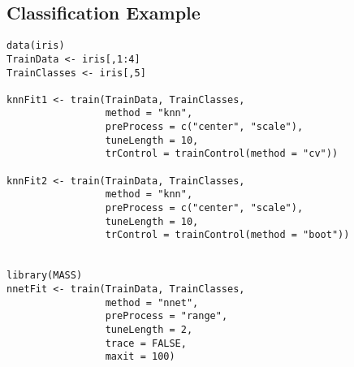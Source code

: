 \documentclass[caret-main.tex]{subfiles}
\begin{document}
\subsection{Classification Example}
\begin{framed} 
\begin{verbatim} 
data(iris)
TrainData <- iris[,1:4]
TrainClasses <- iris[,5]
 
knnFit1 <- train(TrainData, TrainClasses,
                 method = "knn",
                 preProcess = c("center", "scale"),
                 tuneLength = 10,
                 trControl = trainControl(method = "cv"))
 
knnFit2 <- train(TrainData, TrainClasses,
                 method = "knn",
                 preProcess = c("center", "scale"),
                 tuneLength = 10, 
                 trControl = trainControl(method = "boot"))
 
 
library(MASS)
nnetFit <- train(TrainData, TrainClasses,
                 method = "nnet",
                 preProcess = "range", 
                 tuneLength = 2,
                 trace = FALSE,
                 maxit = 100)

\end{verbatim}
\end{framed}
\end{document}
